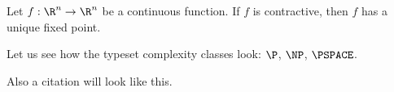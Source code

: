 \begin{theorem}
    \label{thm:fixed_point}
    Let $f: \R^n \to \R^n$ be a continuous function. If $f$ is
    contractive, then $f$ has a unique fixed point.
\end{theorem}
Let us see how the typeset complexity classes look: $\P$, $\NP$, $\PSPACE$.

Also a citation will look like this.
